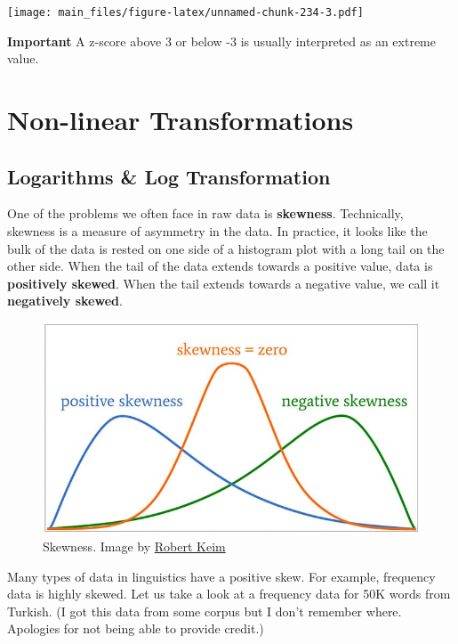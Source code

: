 \documentclass[
]{book}
\begin{document}
\texttt{[image: main\_files/figure-latex/unnamed-chunk-234-3.pdf]}

\textbf{Important} A z-score above 3 or below -3 is usually interpreted as an extreme value.

\hypertarget{non-linear-transformations}{%
\section{Non-linear Transformations}\label{non-linear-transformations}}

\hypertarget{logarithms-log-transformation}{%
\subsection{Logarithms \& Log Transformation}\label{logarithms-log-transformation}}

One of the problems we often face in raw data is \textbf{skewness}. Technically, skewness is a measure of asymmetry in the data. In practice, it looks like the bulk of the data is rested on one side of a histogram plot with a long tail on the other side. When the tail of the data extends towards a positive value, data is \textbf{positively skewed}. When the tail extends towards a negative value, we call it \textbf{negatively skewed}.

\begin{figure}
\centering
\includegraphics{./img/skewness.jpg}
\caption{\label{fig:skewness}Skewness. Image by \href{https://www.allaboutcircuits.com/technical-articles/understanding-the-normal-distribution-parametric-tests-skewness-and-kurtosis/}{Robert Keim}}
\end{figure}

Many types of data in linguistics have a positive skew. For example, frequency data is highly skewed. Let us take a look at a frequency data for 50K words from Turkish. (I got this data from some corpus but I don't remember where. Apologies for not being able to provide credit.)
\end{document}
